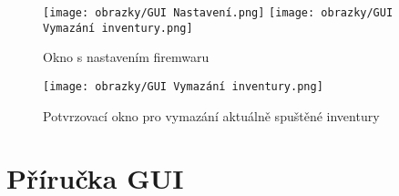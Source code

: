 \begin{figure}[H]
    \begin{center}
        \texttt{[image: obrazky/GUI Nastavení.png]}
        \texttt{[image: obrazky/GUI Vymazání inventury.png]}
    \end{center}
    \caption{Okno s nastavením firemwaru}
    \label{Okno s nastavením aplikace}
\end{figure}

\begin{figure}[H]
    \begin{center}
        \texttt{[image: obrazky/GUI Vymazání inventury.png]}
    \end{center}
    \caption{Potvrzovací okno pro vymazání aktuálně spuštěné inventury}
    \label{Potvrzovací okno pro vymazání aktuálně spuštěné inventury}
\end{figure}



\chapter{Příručka GUI}
